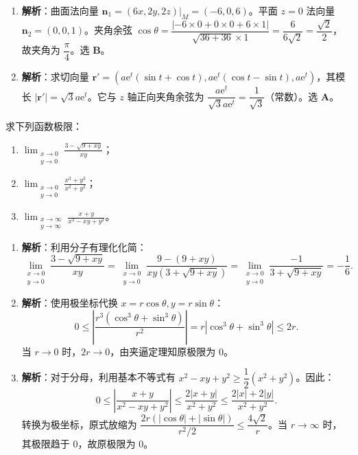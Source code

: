 \documentclass[lang=cn,11pt]{elegantbook}
\begin{document}
\begin{solution}
\begin{enumerate}
  \item \textbf{解析}：曲面法向量 $\boldsymbol n_1 = (6x, 2y, 2z)|_M = (-6, 0, 6)$。平面 $z=0$ 法向量 $\boldsymbol n_2 = (0, 0, 1)$。夹角余弦 $\cos\theta = \dfrac{|-6 \times 0 + 0 \times 0 + 6 \times 1|}{\sqrt{36+36} \times 1} = \dfrac{6}{6\sqrt{2}} = \dfrac{\sqrt{2}}{2}$，故夹角为 $\dfrac{\pi}{4}$。选 \textbf{B}。
  \item \textbf{解析}：求切向量 $\boldsymbol r' = (a\mathrm{e}^t(\sin t+\cos t), a\mathrm{e}^t(\cos t-\sin t), a\mathrm{e}^t)$，其模长 $|\boldsymbol r'| = \sqrt{3}a\mathrm{e}^t$。它与 $z$ 轴正向夹角余弦为 $\dfrac{a\mathrm{e}^t}{\sqrt{3}a\mathrm{e}^t} = \dfrac{1}{\sqrt{3}}$（常数）。选 \textbf{A}。
\end{enumerate}
\end{solution}



\begin{exercise}[多元函数极限的计算]
求下列函数极限：
\begin{enumerate}
  \item $\displaystyle\lim_{\substack{x\to 0 \\ y\to 0}} \frac{3-\sqrt{9+xy}}{xy}$；
  \item $\displaystyle\lim_{\substack{x\to 0 \\ y\to 0}} \frac{x^3+y^3}{x^2+y^2}$；
  \item $\displaystyle\lim_{\substack{x\to\infty \\ y\to\infty}} \frac{x+y}{x^2-xy+y^2}$。
\end{enumerate}
\end{exercise}

\begin{solution}
\begin{enumerate}
  \item \textbf{解析}：利用分子有理化化简：
  \[
  \lim_{\substack{x\to 0 \\ y\to 0}} \frac{3-\sqrt{9+xy}}{xy} = \lim_{\substack{x\to 0 \\ y\to 0}} \frac{9-(9+xy)}{xy(3+\sqrt{9+xy})} = \lim_{\substack{x\to 0 \\ y\to 0}} \frac{-1}{3+\sqrt{9+xy}} = -\frac{1}{6}.
  \]
  
  \item \textbf{解析}：使用极坐标代换 $x = r\cos\theta, y = r\sin\theta$：
  \[
  0 \leq \left| \frac{r^3(\cos^3\theta+\sin^3\theta)}{r^2} \right| = r |\cos^3\theta+\sin^3\theta| \leq 2r.
  \]
  当 $r \to 0$ 时，$2r \to 0$，由夹逼定理知原极限为 $0$。
  
  \item \textbf{解析}：对于分母，利用基本不等式有 $x^2-xy+y^2 \geq \dfrac{1}{2}(x^2+y^2)$。因此：
  \[
  0 \leq \left| \frac{x+y}{x^2-xy+y^2} \right| \leq \frac{2|x+y|}{x^2+y^2} \leq \frac{2|x|+2|y|}{x^2+y^2}.
  \]
  转换为极坐标，原式放缩为 $\dfrac{2r(|\cos\theta|+|\sin\theta|)}{r^2/2} \leq \dfrac{4\sqrt{2}}{r}$。当 $r \to \infty$ 时，其极限趋于 $0$，故原极限为 $0$。
\end{enumerate}
\end{solution}
\end{document}
